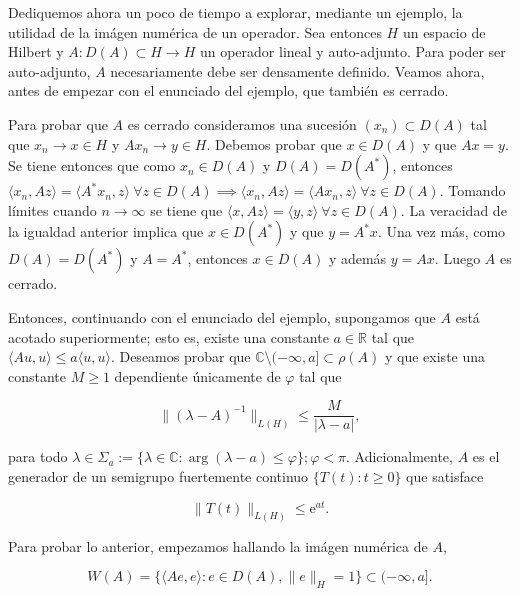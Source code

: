 Dediquemos ahora un poco de tiempo a explorar, mediante un ejemplo, la utilidad de la imágen numérica de un operador. Sea entonces $H$ un espacio de Hilbert y $A : D(A) \subset H \rightarrow H$ un operador lineal y auto-adjunto. Para poder ser auto-adjunto, $A$ necesariamente debe ser densamente definido. Veamos ahora, antes de empezar con el enunciado del ejemplo, que también es cerrado.

Para probar que $A$ es cerrado consideramos una sucesión $(x_n) \subset D(A)$ tal que $x_n \rightarrow x \in H$ y $Ax_n \rightarrow y \in H$. Debemos probar que $x \in D(A)$ y que $Ax = y$. Se tiene entonces que como $x_n \in D(A)$ y $D(A) = D(A^*)$, entonces $\langle x_n, Az \rangle = \langle A^* x_n, z \rangle \ \forall z \in D(A) \implies \langle x_n, Az \rangle = \langle Ax_n, z \rangle \ \forall z \in D(A)$. Tomando límites cuando $n \rightarrow \infty$ se tiene que $\langle x, Az \rangle = \langle y, z\rangle \ \forall z \in D(A)$. La veracidad de la igualdad anterior implica que $x \in D(A^*)$ y que $y = A^*x$. Una vez más, como $D(A) = D(A^*)$ y $A = A^*$, entonces $x \in D(A)$ y además $y = Ax$. Luego $A$ es cerrado.

Entonces, continuando con el enunciado del ejemplo, supongamos que $A$ está acotado superiormente; esto es, existe una constante $a \in \mathbb{R}$ tal que $\langle Au, u \rangle \leq a \langle u, u \rangle$. Deseamos probar que $\mathbb{C} \setminus (-\infty, a] \subset \rho(A)$ y que existe una constante $M \geq 1$ dependiente únicamente de $\varphi$ tal que

\[\lVert (\lambda - A)^{-1}\rVert_{L(H)} \leq \frac{M}{|\lambda - a|},\]

para todo $\lambda \in \Sigma_a := \{\lambda \in \mathbb{C} : \operatorname{arg}(\lambda - a) \leq \varphi\}; \varphi < \pi$. Adicionalmente, $A$ es el generador de un semigrupo fuertemente continuo $\{T(t) : t \geq 0\}$ que satisface

\[\lVert T(t) \rVert_{L(H)} \leq \mathrm{e}^{at}.\]

Para probar lo anterior, empezamos hallando la imágen numérica de $A$,

\[W(A) = \{\langle Ae, e \rangle : e \in D(A), \lVert e \rVert_{H} = 1\} \subset (-\infty, a].\]

